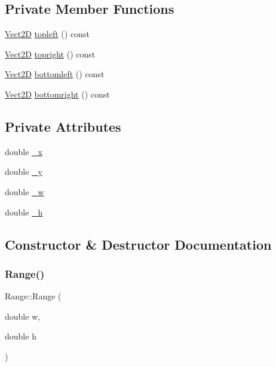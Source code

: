 \subsection*{Private Member Functions}
\begin{DoxyCompactItemize}
\item 
\hyperlink{classVect2D}{Vect2D} \hyperlink{classRange_ac854e35703f632d845ba8a1ba59f7a4d_ac854e35703f632d845ba8a1ba59f7a4d}{topleft} () const
\item 
\hyperlink{classVect2D}{Vect2D} \hyperlink{classRange_a7b1e4a54c72aa3547b94163a4f74a9b7_a7b1e4a54c72aa3547b94163a4f74a9b7}{topright} () const
\item 
\hyperlink{classVect2D}{Vect2D} \hyperlink{classRange_a60dee0a1d68dd669b2e760d29c7641e7_a60dee0a1d68dd669b2e760d29c7641e7}{bottomleft} () const
\item 
\hyperlink{classVect2D}{Vect2D} \hyperlink{classRange_affd99ce93a18978d79d8c1b4ae8acef9_affd99ce93a18978d79d8c1b4ae8acef9}{bottomright} () const
\end{DoxyCompactItemize}
\subsection*{Private Attributes}
\begin{DoxyCompactItemize}
\item 
double \hyperlink{classRange_a63693ff85463b676ee7451693af5c2c1_a63693ff85463b676ee7451693af5c2c1}{\+\_\+x}
\item 
double \hyperlink{classRange_a5367235978a597b4ff99d50c2e06663c_a5367235978a597b4ff99d50c2e06663c}{\+\_\+y}
\item 
double \hyperlink{classRange_a17489275052a741da3c4f7f287a5bea5_a17489275052a741da3c4f7f287a5bea5}{\+\_\+w}
\item 
double \hyperlink{classRange_aa28af6a934404eae4bc9cb016b48fc60_aa28af6a934404eae4bc9cb016b48fc60}{\+\_\+h}
\end{DoxyCompactItemize}


\subsection{Constructor \& Destructor Documentation}
\mbox{\label{classRange_aac818834ebf390ce2b1b8dea544f9123_aac818834ebf390ce2b1b8dea544f9123}} 
\subsubsection{\texorpdfstring{Range()}{Range()}\hspace{0.1cm}{\footnotesize\ttfamily [1/3]}}
{\footnotesize\ttfamily Range\+::\+Range (\begin{DoxyParamCaption}\item[{double}]{w,  }\item[{double}]{h }\end{DoxyParamCaption})\hspace{0.3cm}{\ttfamily [inline]}}

